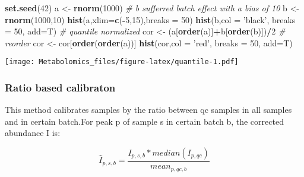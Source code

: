 \documentclass[
]{book}
\newenvironment{Shaded}{\begin{snugshade}}{\end{snugshade}}
\newcommand{\CommentTok}[1]{\textcolor[rgb]{0.56,0.35,0.01}{\textit{#1}}}
\newcommand{\DataTypeTok}[1]{\textcolor[rgb]{0.13,0.29,0.53}{#1}}
\newcommand{\DecValTok}[1]{\textcolor[rgb]{0.00,0.00,0.81}{#1}}
\newcommand{\KeywordTok}[1]{\textcolor[rgb]{0.13,0.29,0.53}{\textbf{#1}}}
\newcommand{\NormalTok}[1]{#1}
\newcommand{\OperatorTok}[1]{\textcolor[rgb]{0.81,0.36,0.00}{\textbf{#1}}}
\newcommand{\StringTok}[1]{\textcolor[rgb]{0.31,0.60,0.02}{#1}}
\begin{document}
\begin{Shaded}
\begin{Highlighting}[]
\KeywordTok{set.seed}\NormalTok{(}\DecValTok{42}\NormalTok{)}
\NormalTok{a <-}\StringTok{ }\KeywordTok{rnorm}\NormalTok{(}\DecValTok{1000}\NormalTok{)}
\CommentTok{# b sufferred batch effect with a bias of 10}
\NormalTok{b <-}\StringTok{ }\KeywordTok{rnorm}\NormalTok{(}\DecValTok{1000}\NormalTok{,}\DecValTok{10}\NormalTok{)}
\KeywordTok{hist}\NormalTok{(a,}\DataTypeTok{xlim=}\KeywordTok{c}\NormalTok{(}\OperatorTok{-}\DecValTok{5}\NormalTok{,}\DecValTok{15}\NormalTok{),}\DataTypeTok{breaks =} \DecValTok{50}\NormalTok{)}
\KeywordTok{hist}\NormalTok{(b,}\DataTypeTok{col =} \StringTok{'black'}\NormalTok{, }\DataTypeTok{breaks =} \DecValTok{50}\NormalTok{, }\DataTypeTok{add=}\NormalTok{T)}
\CommentTok{# quantile normalized}
\NormalTok{cor <-}\StringTok{ }\NormalTok{(a[}\KeywordTok{order}\NormalTok{(a)]}\OperatorTok{+}\NormalTok{b[}\KeywordTok{order}\NormalTok{(b)])}\OperatorTok{/}\DecValTok{2}
\CommentTok{# reorder}
\NormalTok{cor <-}\StringTok{ }\NormalTok{cor[}\KeywordTok{order}\NormalTok{(}\KeywordTok{order}\NormalTok{(a))]}
\KeywordTok{hist}\NormalTok{(cor,}\DataTypeTok{col =} \StringTok{'red'}\NormalTok{, }\DataTypeTok{breaks =} \DecValTok{50}\NormalTok{, }\DataTypeTok{add=}\NormalTok{T)}
\end{Highlighting}
\end{Shaded}

\texttt{[image: Metabolomics\_files/figure-latex/quantile-1.pdf]}

\hypertarget{ratio-based-calibraton}{%
\subsubsection{Ratio based calibraton}\label{ratio-based-calibraton}}

This method calibrates samples by the ratio between qc samples in all samples and in certain batch.For peak p of sample s in certain batch b, the corrected abundance I is:

\[\hat I_{p,s,b} = \frac{I_{p,s,b} * median(I_{p,qc})}{mean_{p,qc,b}}\]
\end{document}
